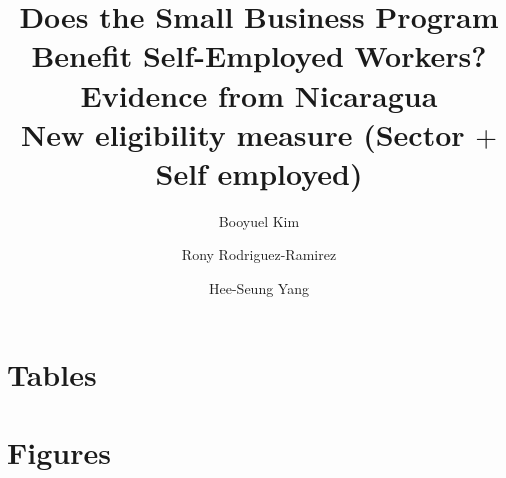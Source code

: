 \documentclass{article}
\begin{document}
\title{Does the Small Business Program Benefit Self-Employed Workers?  Evidence from Nicaragua \\ New eligibility measure (Sector $+$ Self employed)} 
\author{Booyuel Kim \and Rony Rodriguez-Ramirez \and Hee-Seung Yang}
\maketitle
\listoftables
\listoffigures
\newpage 
\section{Tables}


\newpage 
\section{Figures}


\end{document}
